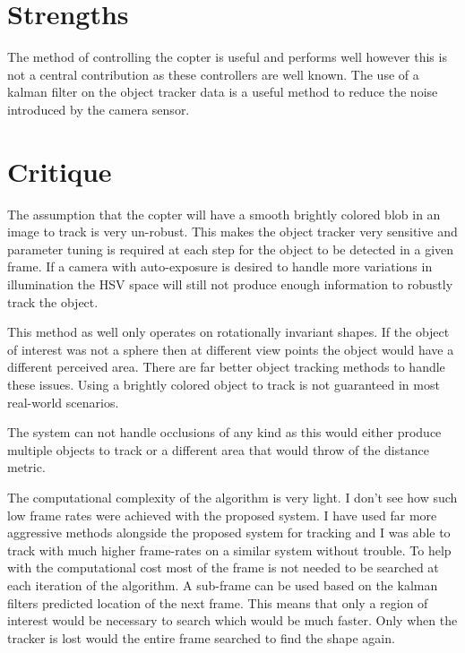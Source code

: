\documentclass{article}
\begin{document}
\section*{Strengths}
The method of controlling the copter is useful and performs well however this is not a central contribution as these controllers are well known. The use of a kalman filter on the object tracker data is a useful method to reduce the noise introduced by the camera sensor.
\section*{Critique}
The assumption that the copter will have a smooth brightly colored blob in an image to track is very un-robust. This makes the object tracker very sensitive and parameter tuning is required at each step for the object to be detected in a given frame. If a camera with auto-exposure is desired to handle more variations in illumination the HSV space will still not produce enough information to robustly track the object.

This method as well only operates on rotationally invariant shapes. If the object of interest was not a sphere then at different view points the object would have a different perceived area. There are far better object tracking methods to handle these issues. Using a brightly colored object to track is not guaranteed in most real-world scenarios. 

The system can not handle occlusions of any kind as this would either produce multiple objects to track or a different area that would throw of the distance metric.

The computational complexity of the algorithm is very light. I don't see how such low frame rates were achieved with the proposed system. I have used far more aggressive methods alongside the proposed system for tracking and I was able to track with much higher frame-rates on a similar system without trouble. To help with the computational cost most of the frame is not needed to be searched at each iteration of the algorithm. A sub-frame can be used based on the kalman filters predicted location of the next frame. This means that only a region of interest would be necessary to search which would be much faster. Only when the tracker is lost would the entire frame searched to find the shape again.
\cite{6842280}
\end{document}
